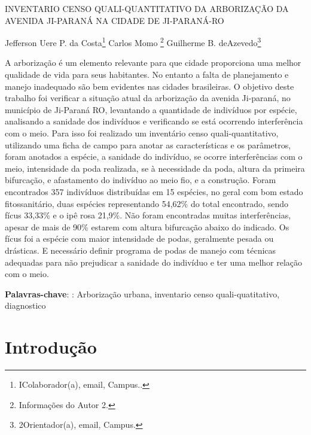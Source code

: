 \documentclass[article,12pt,onesidea,4paper,english,brazil]{abntex2}
\begin{document}
	
	
	\frenchspacing 
	
	\begin{center}
		\LARGE INVENTARIO CENSO QUALI-QUANTITATIVO DA ARBORIZAÇÃO DA AVENIDA JI-PARANÁ NA CIDADE DE JI-PARANÁ-RO
		
		\normalsize
	Jefferson Uere P. da Costa\footnote{IColaborador(a), email, Campus..} 
	Carlos Momo \footnote{Informações do Autor 2.} 
	Guilherme B. deAzevedo\footnote{2Orientador(a), email, Campus.} 
	\end{center}
	
	\begin{resumoumacoluna}
		A arborização é um elemento relevante para que cidade proporciona uma melhor qualidade de vida para seus habitantes. No entanto a falta de planejamento e manejo inadequado são bem evidentes nas cidades brasileiras. O objetivo deste trabalho foi verificar a situação atual da arborização da avenida Ji-paraná, no município de Ji-Paraná RO, levantando a quantidade de indivíduos por espécie, analisando a sanidade dos indivíduos e verificando se está ocorrendo interferência com o meio. Para isso foi realizado um inventário censo quali-quantitativo, utilizando uma ficha de campo para anotar as características e os parâmetros, foram anotados a espécie, a sanidade do indivíduo, se ocorre interferências com o meio, intensidade da poda realizada, se à necessidade da poda, altura da primeira bifurcação, e afastamento do indivíduo ao meio fio, e a construção. Foram encontrados 357 indivíduos distribuídas em 15 espécies, no geral com bom estado fitossanitário, duas espécies representando 54,62\% do total encontrado, sendo fícus 33,33\% e o ipê rosa 21,9\%. Não foram encontradas muitas interferências, apesar de mais de 90\% estarem com altura bifurcação abaixo do indicado. Os fícus foi a espécie com maior intensidade de podas, geralmente pesada ou drásticas. E necessário definir programa de podas de manejo com técnicas adequadas para não prejudicar a sanidade do indivíduo e ter uma melhor relação com o meio.
		
		\vspace{\onelineskip}
		
		\noindent
		\textbf{Palavras-chave}: : Arborização urbana, inventario censo quali-quatitativo, diagnostico
	\end{resumoumacoluna}
	
	\section*{Introdução}
	
\end{document}
